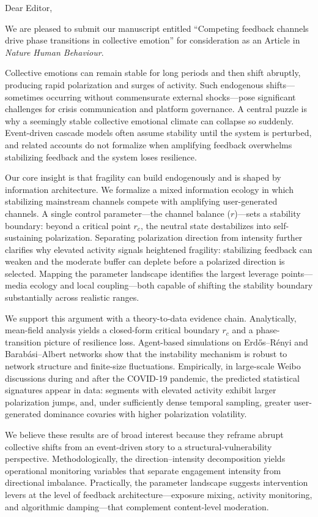\documentclass[11pt]{article}
\begin{document}
Dear Editor,

We are pleased to submit our manuscript entitled ``Competing feedback channels drive phase transitions in collective emotion'' for consideration as an Article in \textit{Nature Human Behaviour}.

Collective emotions can remain stable for long periods and then shift abruptly, producing rapid polarization and surges of activity. Such endogenous shifts---sometimes occurring without commensurate external shocks---pose significant challenges for crisis communication and platform governance. A central puzzle is why a seemingly stable collective emotional climate can collapse so suddenly. Event-driven cascade models often assume stability until the system is perturbed, and related accounts do not formalize when amplifying feedback overwhelms stabilizing feedback and the system loses resilience.

Our core insight is that fragility can build endogenously and is shaped by information architecture. We formalize a mixed information ecology in which stabilizing mainstream channels compete with amplifying user-generated channels. A single control parameter---the channel balance ($r$)---sets a stability boundary: beyond a critical point $r_c$, the neutral state destabilizes into self-sustaining polarization. Separating polarization direction from intensity further clarifies why elevated activity signals heightened fragility: stabilizing feedback can weaken and the moderate buffer can deplete before a polarized direction is selected. Mapping the parameter landscape identifies the largest leverage points---media ecology and local coupling---both capable of shifting the stability boundary substantially across realistic ranges.

We support this argument with a theory-to-data evidence chain. Analytically, mean-field analysis yields a closed-form critical boundary $r_c$ and a phase-transition picture of resilience loss. Agent-based simulations on Erd\H{o}s--R\'enyi and Barab\'asi--Albert networks show that the instability mechanism is robust to network structure and finite-size fluctuations. Empirically, in large-scale Weibo discussions during and after the COVID-19 pandemic, the predicted statistical signatures appear in data: segments with elevated activity exhibit larger polarization jumps, and, under sufficiently dense temporal sampling, greater user-generated dominance covaries with higher polarization volatility.

We believe these results are of broad interest because they reframe abrupt collective shifts from an event-driven story to a structural-vulnerability perspective. Methodologically, the direction--intensity decomposition yields operational monitoring variables that separate engagement intensity from directional imbalance. Practically, the parameter landscape suggests intervention levers at the level of feedback architecture---exposure mixing, activity monitoring, and algorithmic damping---that complement content-level moderation.
\end{document}
